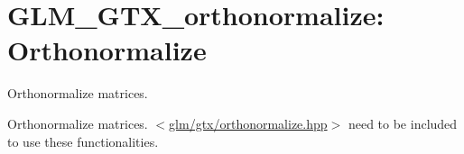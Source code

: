 \hypertarget{group__gtx__orthonormalize}{\section{\-G\-L\-M\-\_\-\-G\-T\-X\-\_\-orthonormalize\-: \-Orthonormalize}
\label{group__gtx__orthonormalize}
}


\-Orthonormalize matrices.  


\-Orthonormalize matrices. $<$\hyperlink{orthonormalize_8hpp}{glm/gtx/orthonormalize.\-hpp}$>$ need to be included to use these functionalities. 